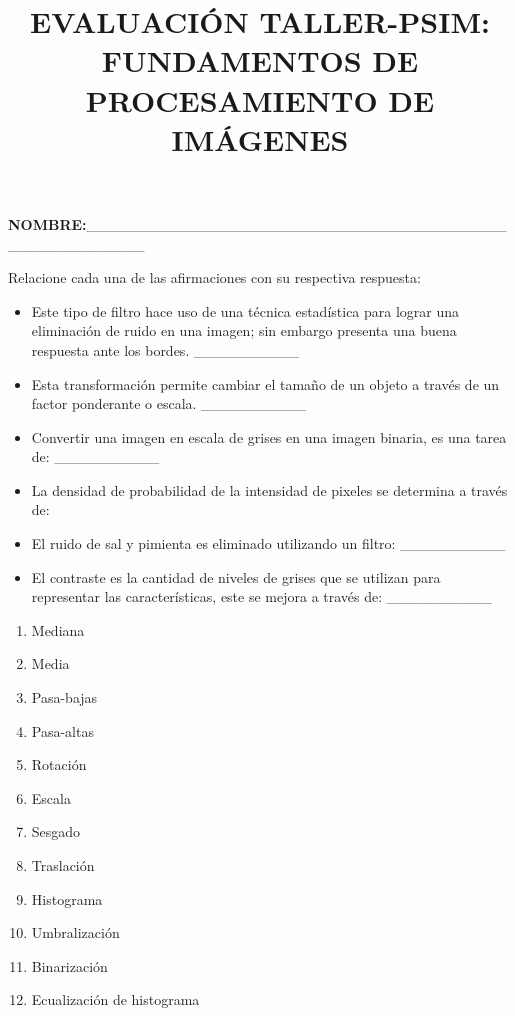 \documentclass[
  letterpaper,
  DIV=11,
  numbers=noendperiod]{scrartcl}
\title{EVALUACIÓN TALLER-PSIM: FUNDAMENTOS DE PROCESAMIENTO DE IMÁGENES}
\author{}
\date{}
\makeatletter
\providecommand{\tightlist}{%
  \setlength{\itemsep}{0pt}\setlength{\parskip}{0pt}}\usepackage{longtable,booktabs,array}
\renewcommand{\maketitle}{\bgroup\setlength{\parindent}{0pt}
\begin{flushleft}
  {\sffamily\huge\textbf{\MakeUppercase{\@title}}} \vspace{0.3cm} \newline
  {\Large {\@subtitle}} \newline
  \@author
\end{flushleft}\egroup
}
\makeatother
\begin{document}
\maketitle

\pagestyle{mystyle}

\textbf{NOMBRE:}\_\_\_\_\_\_\_\_\_\_\_\_\_\_\_\_\_\_\_\_\_\_\_\_\_\_\_\_\_\_\_\_\_\_\_\_\_\_\_\_\_\_\_\_\_\_\_\_\_\_\_\_\_

Relacione cada una de las afirmaciones con su respectiva respuesta:

\begin{itemize}
\item
  Este tipo de filtro hace uso de una técnica estadística para lograr
  una eliminación de ruido en una imagen; sin embargo presenta una buena
  respuesta ante los bordes. \_\_\_\_\_\_\_\_\_\_
\item
  Esta transformación permite cambiar el tamaño de un objeto a través de
  un factor ponderante o escala. \_\_\_\_\_\_\_\_\_\_
\item
  Convertir una imagen en escala de grises en una imagen binaria, es una
  tarea de: \_\_\_\_\_\_\_\_\_\_
\item
  La densidad de probabilidad de la intensidad de pixeles se determina a
  través de:
\item
  El ruido de sal y pimienta es eliminado utilizando un filtro:
  \_\_\_\_\_\_\_\_\_\_
\item
  El contraste es la cantidad de niveles de grises que se utilizan para
  representar las características, este se mejora a través de:
  \_\_\_\_\_\_\_\_\_\_
\end{itemize}

\begin{enumerate}
\def\labelenumi{\arabic{enumi}.}
\tightlist
\item
  Mediana
\item
  Media
\item
  Pasa-bajas
\item
  Pasa-altas
\item
  Rotación
\item
  Escala
\item
  Sesgado
\item
  Traslación
\item
  Histograma
\item
  Umbralización
\item
  Binarización
\item
  Ecualización de histograma
\end{enumerate}
\end{document}
